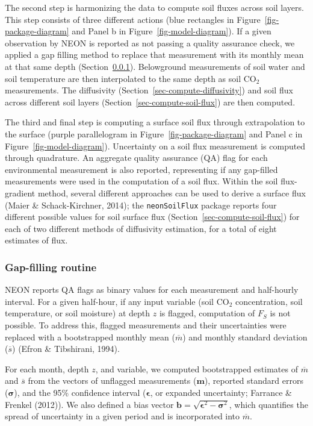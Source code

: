 \documentclass[
  letterpaper,
  DIV=11,
  numbers=noendperiod]{scrartcl}
\begin{document}
The second step is harmonizing the data to compute soil fluxes across
soil layers. This step consists of three different actions (blue
rectangles in Figure~\ref{fig-package-diagram} and Panel b in
Figure~\ref{fig-model-diagram}). If a given observation by NEON is
reported as not passing a quality assurance check, we applied a gap
filling method to replace that measurement with its monthly mean at that
same depth (Section~\ref{sec-gapfilling}). Belowground measurements of
soil water and soil temperature are then interpolated to the same depth
as soil CO\(_{2}\) measurements. The diffusivity
(Section~\ref{sec-compute-diffusivity}) and soil flux across different
soil layers (Section~\ref{sec-compute-soil-flux}) are then computed.

The third and final step is computing a surface soil flux through
extrapolation to the surface (purple parallelogram in
Figure~\ref{fig-package-diagram} and Panel c in
Figure~\ref{fig-model-diagram}). Uncertainty on a soil flux measurement
is computed through quadrature. An aggregate quality assurance (QA) flag
for each environmental measurement is also reported, representing if any
gap-filled measurements were used in the computation of a soil flux.
Within the soil flux-gradient method, several different approaches can
be used to derive a surface flux (Maier \& Schack-Kirchner, 2014); the
\texttt{neonSoilFlux} package reports four different possible values for
soil surface flux (Section~\ref{sec-compute-soil-flux}) for each of two
different methods of diffusivity estimation, for a total of eight
estimates of flux.

\subsubsection{Gap-filling routine}\label{sec-gapfilling}

NEON reports QA flags as binary values for each measurement and
half-hourly interval. For a given half-hour, if any input variable (soil
CO\(_2\) concentration, soil temperature, or soil moisture) at depth
\(z\) is flagged, computation of \(F_S\) is not possible. To address
this, flagged measurements and their uncertainties were replaced with a
bootstrapped monthly mean (\(\overline{m}\)) and monthly standard
deviation (\(\overline{s}\)) (Efron \& Tibshirani, 1994).

For each month, depth \(z\), and variable, we computed bootstrapped
estimates of \(\overline{m}\) and \(\overline{s}\) from the vectors of
unflagged measurements (\(\mathbf{m}\)), reported standard errors
(\(\boldsymbol\sigma\)), and the 95\% confidence interval
(\(\boldsymbol\epsilon\), or expanded uncertainty; Farrance \& Frenkel
(2012)). We also defined a bias vector
\(\mathbf{b}=\sqrt{\boldsymbol\epsilon^{2}-\boldsymbol\sigma^{2}}\),
which quantifies the spread of uncertainty in a given period and is
incorporated into \(\overline{m}\).
\end{document}

